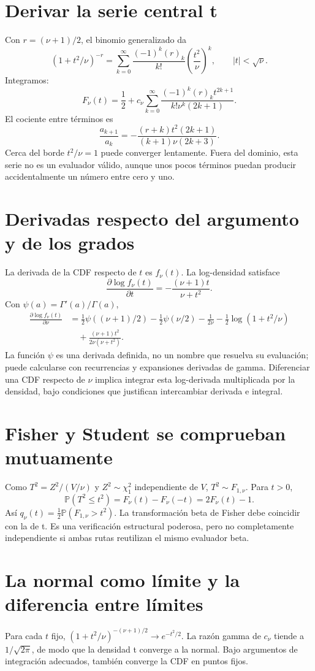 \documentclass[11pt,a4paper]{article}
\newcommand{\Prob}{\mathbb P}
\theoremstyle{definition}
\begin{document}
\section{Derivar la serie central t}
Con $r=(\nu+1)/2$, el binomio generalizado da
\[
(1+t^2/\nu)^{-r}
=\sum_{k=0}^\infty\frac{(-1)^k(r)_k}{k!}
\left(\frac{t^2}{\nu}\right)^k,
\qquad |t|<\sqrt\nu.
\]
Integramos:
\[
F_\nu(t)=\frac12+
c_\nu\sum_{k=0}^\infty
\frac{(-1)^k(r)_k t^{2k+1}}{k!\nu^k(2k+1)}.
\]
El cociente entre términos es
\[
\frac{a_{k+1}}{a_k}
=-\frac{(r+k)t^2(2k+1)}
{(k+1)\nu(2k+3)}.
\]
Cerca del borde $t^2/\nu=1$ puede converger lentamente.
Fuera del dominio, esta serie no es un evaluador válido, aunque unos pocos términos puedan producir accidentalmente un número entre cero y uno.

\section{Derivadas respecto del argumento y de los grados}
La derivada de la CDF respecto de $t$ es $f_\nu(t)$.
La log-densidad satisface
\[
\frac{\partial\log f_\nu(t)}{\partial t}
=-\frac{(\nu+1)t}{\nu+t^2}.
\]
Con $\psi(a)=\Gamma'(a)/\Gamma(a)$,
\[
\begin{aligned}
\frac{\partial\log f_\nu(t)}{\partial\nu}
&=\frac12\psi((\nu+1)/2)-\frac12\psi(\nu/2)
-\frac1{2\nu}-\frac12\log(1+t^2/\nu)\\
&\quad+\frac{(\nu+1)t^2}{2\nu(\nu+t^2)}.
\end{aligned}
\]
La función $\psi$ es una derivada definida, no un nombre que resuelva su evaluación; puede calcularse con recurrencias y expansiones derivadas de gamma.
Diferenciar una CDF respecto de $\nu$ implica integrar esta log-derivada multiplicada por la densidad, bajo condiciones que justifican intercambiar derivada e integral.

\section{Fisher y Student se comprueban mutuamente}
Como $T^2=Z^2/(V/\nu)$ y $Z^2\sim\chi_1^2$ independiente de $V$,
$T^2\sim F_{1,\nu}$.
Para $t>0$,
\[
\Prob(T^2\le t^2)=F_\nu(t)-F_\nu(-t)=2F_\nu(t)-1.
\]
Así
$q_\nu(t)=\tfrac12\Prob(F_{1,\nu}>t^2)$.
La transformación beta de Fisher debe coincidir con la de t.
Es una verificación estructural poderosa, pero no completamente independiente si ambas rutas reutilizan el mismo evaluador beta.

\section{La normal como límite y la diferencia entre límites}
Para cada $t$ fijo,
$(1+t^2/\nu)^{-(\nu+1)/2}\to e^{-t^2/2}$.
La razón gamma de $c_\nu$ tiende a $1/\sqrt{2\pi}$, de modo que la densidad t converge a la normal.
Bajo argumentos de integración adecuados, también converge la CDF en puntos fijos.
\end{document}
